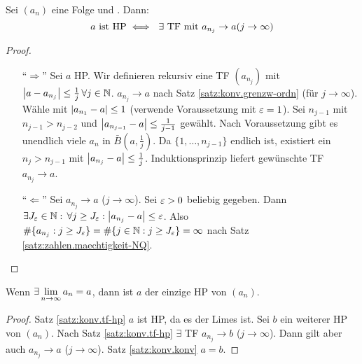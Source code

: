 \documentclass[12pt]{scrreprt}
\begin{document}
\begin{satz}
\label{satz:konv.tf-hp}
Sei $(a_n)$ eine Folge und . Dann:
\[a \text{ ist HP} \iff \ \exists \text{ TF mit } a_{n_j} \to a (j\to\infty)\]
\end{satz}
\begin{proof}
\begin{enumerate}
\item["`$\Rightarrow$"'] Sei $a$ HP. Wir definieren rekursiv eine TF $(a_{n_j})$ mit $\left\lvert a-a_{n_j}\right\lvert\le\frac1j\,\forall j\in\mathbb{N}$. \folgt $a_{n_j}\to a$ nach Satz \ref{satz:konv.grenzw-ordn} (für $j\to\infty$). Wähle  mit $\left\lvert a_{n_1}-a\right\lvert\le1$ (verwende Voraussetzung mit $\varepsilon=1$). Sei $n_{j-1}$ mit $n_{j-1}>n_{j-2}$ und $\left\lvert a_{n_{j-1}}-a\right\lvert\le\frac{1}{j-1}$ gewählt. Nach Voraussetzung gibt es unendlich viele $a_n$ in $\bar{B}(a,\frac1j)$. Da $\{1,\dotsc,n_{j-1}\}$ endlich ist, existiert ein $n_j>n_{j-1}$ mit $\left\lvert a_{n_j}-a\right\lvert\le\frac1j$. Induktionsprinzip liefert gewünschte TF $a_{n_j}\to a$.
\item["`$\Leftarrow$"'] Sei $a_{n_j}\to a$ ($j\to\infty$). Sei $\varepsilon>0$ beliebig gegeben. Dann $\exists J_\varepsilon\in\mathbb{N}:\,\forall j\ge J_\varepsilon:\left\lvert a_{n_j}-a\right\lvert\le\varepsilon$. Also $\#\{a_{n_j}:j\ge J_\varepsilon\} = \#\{j\in\mathbb{N}:j\ge J_\varepsilon\}=\infty$ nach Satz \ref{satz:zahlen.maechtigkeit-NQ}.
\end{enumerate}
\end{proof}

\begin{kor}
\label{kor:konv.lim-hp}
Wenn $\exists\lim\limits_{n\rightarrow\infty}{a_n}=a$, dann ist $a$ der einzige HP von $(a_n)$.
\end{kor}
\begin{proof}
Satz \ref{satz:konv.tf-hp} \folgt $a$ ist HP, da es der Limes ist. Sei $b$ ein weiterer HP von $(a_n)$. Nach Satz \ref{satz:konv.tf-hp} $\exists$ TF $a_{n_j}\to b$ ($j\to\infty$). Dann gilt aber auch $a_{n_j}\to a$ ($j\to\infty$). Satz \ref{satz:konv.konv} \folgt $a=b$.
\end{proof}
\end{document}
